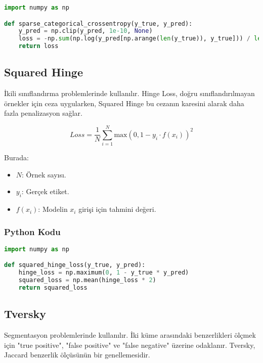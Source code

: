 \begin{lstlisting}[language=Python]
import numpy as np

def sparse_categorical_crossentropy(y_true, y_pred):
    y_pred = np.clip(y_pred, 1e-10, None)
    loss = -np.sum(np.log(y_pred[np.arange(len(y_true)), y_true])) / len(y_true)
    return loss
\end{lstlisting}

\newpage

\subsection{Squared Hinge}

İkili sınıflandırma problemlerinde kullanılır. Hinge Loss, doğru sınıflandırılmayan örnekler için ceza uygularken, Squared Hinge bu cezanın karesini alarak daha fazla penalizasyon sağlar.

\[ Loss = \frac{1}{N} \sum_{i=1}^{N} \text{max}(0, 1 - y_i \cdot f(x_i))^2 \]

Burada:

\begin{itemize}
    \item $N$: Örnek sayısı.
    \item $y_i$: Gerçek etiket.
    \item $f(x_i)$: Modelin $x_i$ girişi için tahmini değeri.
\end{itemize}

\subsubsection{Python Kodu}

\begin{lstlisting}[language=Python]
import numpy as np

def squared_hinge_loss(y_true, y_pred):
    hinge_loss = np.maximum(0, 1 - y_true * y_pred)
    squared_loss = np.mean(hinge_loss * 2)
    return squared_loss
\end{lstlisting}

\newpage

\subsection{Tversky}

Segmentasyon problemlerinde kullanılır. İki küme arasındaki benzerlikleri ölçmek için "true positive", "false positive" ve "false negative" üzerine odaklanır. Tversky, Jaccard benzerlik ölçüsünün bir genellemesidir.

